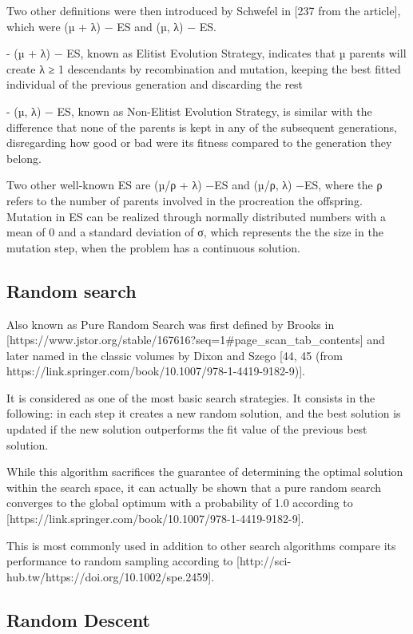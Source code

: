 Two other definitions were then introduced by Schwefel in [237 from the article], which were (µ + λ) − ES and (µ, λ) − ES.

    - (µ + λ) − ES, known as Elitist Evolution Strategy, indicates that µ parents will create λ ≥ 1 descendants by recombination and mutation, keeping the best fitted individual of the previous generation and discarding the rest
    
    - (µ, λ) − ES, known as Non-Elitist Evolution Strategy, is similar with the difference that none of the parents is kept in any of the subsequent generations, disregarding how good or bad were its fitness compared to the generation they belong.

Two other well-known ES are (µ/ρ + λ) −ES and (µ/ρ, λ) −ES, where the ρ refers to the number of parents involved in the procreation the offspring. Mutation in ES can be realized through normally distributed numbers with a mean of 0 and a standard deviation of σ, which represents the the size in the mutation step, when the problem has a continuous solution.

\subsection{Random search} 

Also known as Pure Random Search was first defined by Brooks in [https://www.jstor.org/stable/167616?seq=1#page_scan_tab_contents] and later named in the classic volumes by Dixon and Szego [44, 45 (from  https://link.springer.com/book/10.1007/978-1-4419-9182-9)].

It is considered as one of the most basic search strategies. It consists in the following: in each step it creates a new random solution, and the best solution is updated if the new solution outperforms the fit value of the previous best solution.

While this algorithm sacrifices the guarantee of determining the optimal solution within the search space, it can actually be shown that a pure random search converges to the global optimum with a probability of 1.0 according to [https://link.springer.com/book/10.1007/978-1-4419-9182-9].

This is most commonly used in addition to other search algorithms compare its performance to random sampling according to [http://sci-hub.tw/https://doi.org/10.1002/spe.2459].

\subsection{Random Descent} 

